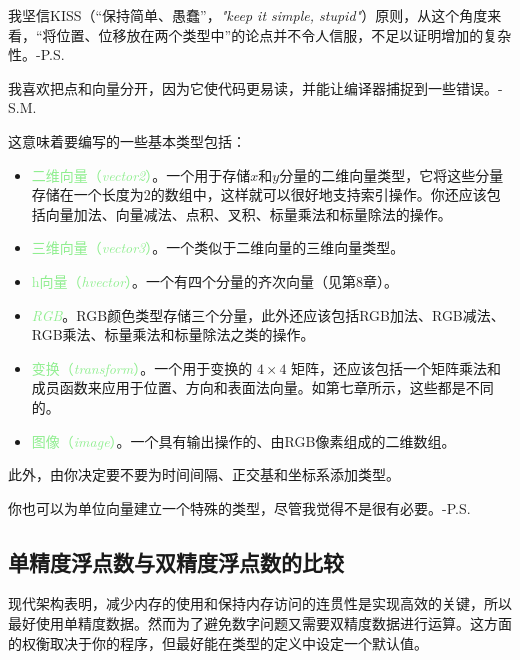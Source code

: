 \documentclass[lang=cn,12pt]{elegantbook}
\begin{document}
\begin{note}
我坚信KISS（“保持简单、愚蠢”，\textit{"keep it simple, stupid"}）原则，从这个角度来看，“将位置、位移放在两个类型中”的论点并不令人信服，不足以证明增加的复杂性。-P.S.
\end{note}

\begin{note}
我喜欢把点和向量分开，因为它使代码更易读，并能让编译器捕捉到一些错误。-S.M.
\end{note}

这意味着要编写的一些基本类型包括：

\begin{itemize}
  \item \textcolor{lightgreen}{二维向量（\textit{vector2}）}。一个用于存储$x$和$y$分量的二维向量类型，它将这些分量存储在一个长度为2的数组中，这样就可以很好地支持索引操作。你还应该包括向量加法、向量减法、点积、叉积、标量乘法和标量除法的操作。
  \item \textcolor{lightgreen}{三维向量（\textit{vector3}）}。一个类似于二维向量的三维向量类型。
  \item \textcolor{lightgreen}{h向量（\textit{hvector}）}。一个有四个分量的齐次向量（见第8章）。
  \item \textcolor{lightgreen}{\textit{RGB}}。RGB颜色类型存储三个分量，此外还应该包括RGB加法、RGB减法、RGB乘法、标量乘法和标量除法之类的操作。
  \item \textcolor{lightgreen}{变换（\textit{transform}）}。一个用于变换的 $4 \times 4$ 矩阵，还应该包括一个矩阵乘法和成员函数来应用于位置、方向和表面法向量。如第七章所示，这些都是不同的。
  \item \textcolor{lightgreen}{图像（\textit{image}）}。一个具有输出操作的、由RGB像素组成的二维数组。
\end{itemize}

此外，由你决定要不要为时间间隔、正交基和坐标系添加类型。

\begin{note}
你也可以为单位向量建立一个特殊的类型，尽管我觉得不是很有必要。-P.S.
\end{note}

\subsection{单精度浮点数与双精度浮点数的比较 }

现代架构表明，减少内存的使用和保持内存访问的连贯性是实现高效的关键，所以最好使用单精度数据。然而为了避免数字问题又需要双精度数据进行运算。这方面的权衡取决于你的程序，但最好能在类型的定义中设定一个默认值。
\end{document}
